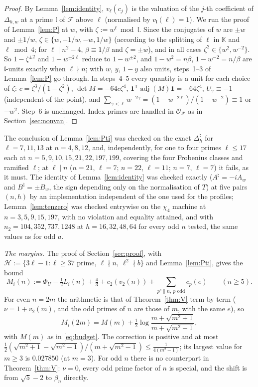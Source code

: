\documentclass[11pt]{amsart}
\theoremstyle{definition}
\theoremstyle{remark}
\numberwithin{equation}{section}
\newcommand{\KK}{\mathbb{K}}
\newcommand{\cF}{\mathcal{F}}
\newcommand{\cO}{\mathcal{O}}
\newcommand{\fl}{\mathfrak{l}}
\newcommand{\one}{\mathbf{1}}
\newcommand{\adj}{\operatorname{adj}}
\begin{document}
\begin{proof}
By Lemma~\ref{lem:identity}, $v_\ell(c_j)$ is the valuation of the $j$-th coefficient of $\Delta_{h,w}$ at a prime $\fl$
of $\cF$ above $\ell$ (normalised by $v_\fl(\ell)=1$). We run the proof of Lemma~\ref{lem:P} at $w$, with
$\zeta:=w^\ell\bmod\fl$. Since the conjugates of $w$ are $\pm w$ and $\pm1/w$, $\zeta\in\{w,-1/w,-w,1/w\}$ (according to
the splitting of $\ell$ in $\KK$ and $\ell\bmod4$; for $\ell\mid n^2-4$, $\beta\equiv1/\beta$ and $\zeta=\pm w$), and in
all cases $\zeta^2\in\{w^2,w^{-2}\}$. So $1-\zeta^{\pm2}$ and $1-w^{\pm2\ell}$ reduce to $1-w^{\pm2}$, and $1-w^2=n\beta$,
$1-w^{-2}=n/\beta$ are $\fl$-units exactly when $\ell\nmid n$; with $w$, $y$, $1-y$ also units, steps~1--3 of
Lemma~\ref{lem:P} go through. In steps~4--5 every quantity is a unit for each choice of $\zeta$: $c=\zeta^3/(1-\zeta^2)$,
$\det M=-64c\zeta^4$, $\one^{\mathsf T}\adj(M)\one=-64\zeta^4$, $U_\gamma\equiv-1$ (independent of the point), and
$\sum_{\gamma<\ell}w^{-2\gamma}=(1-w^{-2\ell})/(1-w^{-2})\equiv1$ or $-w^2$. Step~6 is unchanged. Index primes are
handled in $\cO_\cF$ as in Section~\ref{sec:nonvan}.
\end{proof}

The conclusion of Lemma~\ref{lem:Pti} was checked on the exact $\Delta^\natural_h$ for $\ell=7,11,13$ at $n=4,8,12$,
and, independently, for one to four primes $\ell\le17$ each at $n=5,9,10,15,21,22,197,199$, covering the four Frobenius classes and ramified $\ell$; at $\ell\mid n$
($n=21$, $\ell=7$; $n=22$, $\ell=11$; $n=7$, $\ell=7$) it fails, as it must. The identity of Lemma~\ref{lem:identity} was
checked exactly ($A^\natural=-iA_w$ and $B^\natural=\pm B_w$, the sign depending only on the normalisation of $T$) at five
pairs $(n,h)$ by an implementation independent of the one used for the profiles; Lemma~\ref{lem:tenzero} was checked
entrywise on the $\chi_4$ machine at $n=3,5,9,15,197$, with no violation and equality attained, and with
$n_2=104,352,737,1248$ at $h=16,32,48,64$ for every odd $n$ tested, the same values as for odd $a$.

\emph{The margins.} The proof of Section~\ref{sec:proof}, with $\mathcal H:=\{3\ell-1:\ell\ge37\text{ prime},\ \ell\nmid
n,\ \ell^2\nmid b\}$ and Lemma~\ref{lem:Pti}, gives the bound
\begin{equation}\label{eq:Mti}
  M_i(n):=\Phi_U-\tfrac12L_i(n)+\tfrac43+c_2(v_2(n))+\sum_{p^e\parallel n,\ p\text{ odd}}c_p(e)\qquad(n\ge5).
\end{equation}
For even $n=2m$ the arithmetic is that of Theorem~\ref{thm:V} term by term ($\nu=1+v_2(m)$, and the odd primes of $n$ are
those of $m$, with the same $e$), so
\[
  M_i(2m)=M(m)+\tfrac12\log\frac{m+\sqrt{m^2+1}}{m+\sqrt{m^2-1}},
\]
with $M(m)$ as in \eqref{eq:budget}. The correction is positive and at most
$\frac12(\sqrt{m^2+1}-\sqrt{m^2-1})/(m+\sqrt{m^2-1})\le\frac1{4(m^2-1)}$; its largest value for $m\ge3$ is $0.027850$
(at $m=3$). For odd $n$ there is no counterpart in Theorem~\ref{thm:V}: $\nu=0$, every odd prime factor of $n$ is special,
and the shift is from $\sqrt5-2$ to $\beta_n$ directly.
\end{document}
